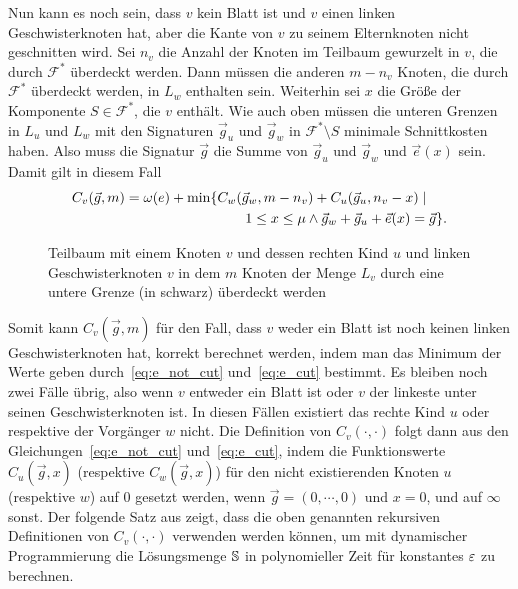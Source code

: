 Nun kann es noch sein, dass $v$ kein Blatt ist und $v$ einen linken Geschwisterknoten hat, aber die Kante von $v$ zu seinem Elternknoten nicht geschnitten wird.
Sei $n_v$ die Anzahl der Knoten im Teilbaum gewurzelt in $v$, die durch $\mathcal{F}^*$ überdeckt werden.
Dann müssen die anderen $m - n_v$ Knoten, die durch $\mathcal{F}^*$ überdeckt werden, in $L_w$ enthalten sein.
Weiterhin sei $x$ die Größe der Komponente $S \in \mathcal{F}^*$, die $v$ enthält.
Wie auch oben müssen die unteren Grenzen in $L_u$ und $L_w$ mit den Signaturen $\vec{g}_u$ und $\vec{g}_w$ in $\mathcal{F}^* \setminus {S}$ minimale Schnittkosten haben.
Also muss die Signatur $\vec{g}$ die Summe von $\vec{g}_u$ und $\vec{g}_w$ und $\vec{e}(x)$ sein.
Damit gilt in diesem Fall
\begin{equation}\label{eq:e_cut}
    \begin{aligned}
        C_v(\vec{g}, m) = \omega(e) + \min \{ & C_w(\vec{g}_w, m - n_v) + C_u(\vec{g}_u, n_v - x) \mid \\ & \qquad 1 \leq x \leq \mu \land \vec{g}_w + \vec{g}_u + \vec{e}(x) = \vec{g} \}.
    \end{aligned}
\end{equation}

\begin{figure}
    \centering
    
    \caption{Teilbaum mit einem Knoten $v$ und dessen rechten Kind $u$ und linken Geschwisterknoten $v$ in dem $m$ Knoten der Menge $L_v$ durch eine untere Grenze (in schwarz) überdeckt werden}
\end{figure}

Somit kann $C_v(\vec{g}, m)$ für den Fall, dass $v$ weder ein Blatt ist noch keinen linken Geschwisterknoten hat, korrekt berechnet werden, indem man das Minimum der Werte geben durch~\eqref{eq:e_not_cut} und~\eqref{eq:e_cut} bestimmt.
Es bleiben noch zwei Fälle übrig, also wenn $v$ entweder ein Blatt ist oder $v$ der linkeste unter seinen Geschwisterknoten ist.
In diesen Fällen existiert das rechte Kind $u$ oder respektive der Vorgänger $w$ nicht.
Die Definition von $C_v(\cdot, \cdot)$ folgt dann aus den Gleichungen~\eqref{eq:e_not_cut} und~\eqref{eq:e_cut}, indem die Funktionswerte $C_u(\vec{g}, x)$ (respektive $C_w(\vec{g}, x)$) für den nicht existierenden Knoten $u$ (respektive $w$) auf $0$ gesetzt werden, wenn $\vec{g} = (0, \cdots, 0)$ und $x = 0$, und auf $\infty$ sonst. 
Der folgende Satz aus \parencite{FF15} zeigt, dass die oben genannten rekursiven Definitionen von $C_v(\cdot, \cdot)$ verwenden werden können, um mit dynamischer Programmierung die Lösungsmenge $\mathbb{S}$ in polynomieller Zeit für konstantes $\varepsilon$ zu berechnen.

